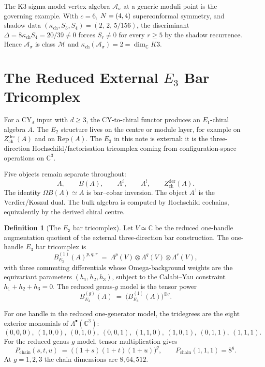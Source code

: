 \documentclass[11pt]{article}
\theoremstyle{plain}
\theoremstyle{definition}
\newtheorem{definition}[theorem]{Definition}
\theoremstyle{remark}
\newcommand{\C}{\mathbb{C}}
\newcommand{\Rep}{\mathrm{Rep}}
\newcommand{\cA}{\mathcal{A}}
\newcommand{\kch}{\kappa_{\mathrm{ch}}}
\begin{document}
The K3 sigma-model vertex algebra $\cA_\sigma$ at a generic moduli point is
the governing example. With $c=6$, $N=(4,4)$ superconformal symmetry, and
shadow data $(\kch, S_3, S_4)=(2,\,2,\,5/156)$, the discriminant
$\Delta=8\kch S_4=20/39\ne 0$ forces $S_r\ne 0$ for every $r\ge 5$ by the
shadow recurrence. Hence $\cA_\sigma$ is class $\mathcal{M}$ and
$\kch(\cA_\sigma)=2=\dim_\C K3$.

\section{The Reduced External \texorpdfstring{$E_3$}{E3} Bar Tricomplex}
\label{sec:e3-bar-chain-level}

For a CY$_d$ input with $d\geq 3$, the CY-to-chiral functor produces an
$E_1$-chiral algebra $A$. The $E_2$ structure lives on the centre or module
layer, for example on $Z^{\mathrm{der}}_{\mathrm{ch}}(A)$ and on
$\Rep(A)$. The $E_3$ in this note is external: it is the three-direction
Hochschild/factorisation tricomplex coming from configuration-space
operations on $\C^3$.

Five objects remain separate throughout:
\[
 A,\qquad B(A),\qquad A^i,\qquad A^!,\qquad
 Z^{\mathrm{der}}_{\mathrm{ch}}(A).
\]
The identity $\Omega B(A)\simeq A$ is bar--cobar inversion. The object
$A^!$ is the Verdier/Koszul dual. The bulk algebra is computed by
Hochschild cochains, equivalently by the derived chiral centre.

\begin{definition}[The $E_3$ bar tricomplex]
\label{def:e3-tricomplex}
Let $V\simeq\C$ be the reduced one-handle augmentation quotient of the
external three-direction bar construction. The one-handle $E_3$ bar
tricomplex is
\[
 B_{E_3}^{(1)}(A)^{p,q,r} \;=\; \Lambda^p(V)\otimes\Lambda^q(V)\otimes\Lambda^r(V),
\]
with three commuting differentials whose Omega-background weights are the
equivariant parameters $(h_1,h_2,h_3)$, subject to the Calabi--Yau constraint
$h_1+h_2+h_3=0$.
The reduced genus-$g$ model is the tensor power
\[
 B_{E_3}^{(g)}(A) \;=\; \bigl(B_{E_3}^{(1)}(A)\bigr)^{\otimes g}.
\]
\end{definition}

For one handle in the reduced one-generator model, the tridegrees are the
eight exterior monomials of $\Lambda^\bullet(\C^3)$:
\[
 (0,0,0),\ (1,0,0),\ (0,1,0),\ (0,0,1),\
 (1,1,0),\ (1,0,1),\ (0,1,1),\ (1,1,1).
\]
For the reduced genus-$g$ model, tensor multiplication gives
\[
 P_{\mathrm{chain}}(s,t,u) \;=\; \bigl((1+s)(1+t)(1+u)\bigr)^g,
 \qquad P_{\mathrm{chain}}(1,1,1) = 8^g.
\]
At $g=1,2,3$ the chain dimensions are $8,64,512$.
\end{document}

